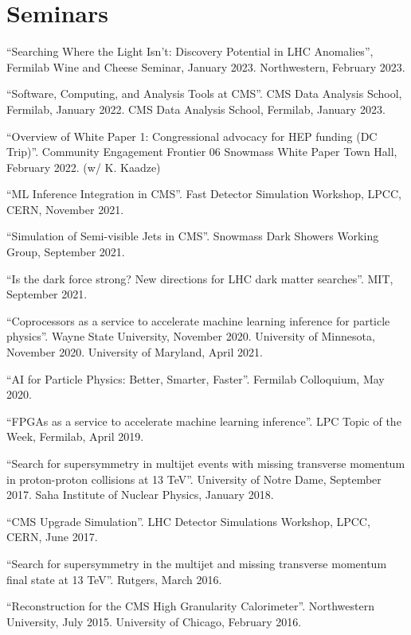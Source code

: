 \section{Seminars}
\begin{description}[leftmargin=12pt,font=\normalfont,labelsep=0em]
\item ``Searching Where the Light Isn't: Discovery Potential in LHC Anomalies'', Fermilab Wine and Cheese Seminar, January 2023. Northwestern, February 2023.
\item ``Software, Computing, and Analysis Tools at CMS''. CMS Data Analysis School, Fermilab, January 2022. CMS Data Analysis School, Fermilab, January 2023.
\item ``Overview of White Paper 1: Congressional advocacy for HEP funding (DC Trip)''. Community Engagement Frontier 06 Snowmass White Paper Town Hall, February 2022. (w/ K. Kaadze)
\item ``ML Inference Integration in CMS''. Fast Detector Simulation Workshop, LPCC, CERN, November 2021.
\item ``Simulation of Semi-visible Jets in CMS''. Snowmass Dark Showers Working Group, September 2021.
\item ``Is the dark force strong? New directions for LHC dark matter searches''. MIT, September 2021.
\item ``Coprocessors as a service to accelerate machine learning inference for particle physics''. Wayne State University, November 2020. University of Minnesota, November 2020. University of Maryland, April 2021.
\item ``AI for Particle Physics: Better, Smarter, Faster''. Fermilab Colloquium, May 2020.
\item ``FPGAs as a service to accelerate machine learning inference''. LPC Topic of the Week, Fermilab, April 2019.
\item ``Search for supersymmetry in multijet events with missing transverse momentum in proton-proton collisions at 13 TeV''. University of Notre Dame, September 2017. Saha Institute of Nuclear Physics, January 2018.
\item ``CMS Upgrade Simulation''. LHC Detector Simulations Workshop, LPCC, CERN, June 2017.
\item ``Search for supersymmetry in the multijet and missing transverse momentum final state at 13 TeV''. Rutgers, March 2016.
\item ``Reconstruction for the CMS High Granularity Calorimeter''. Northwestern University, July 2015. University of Chicago, February 2016.

\end{description}
